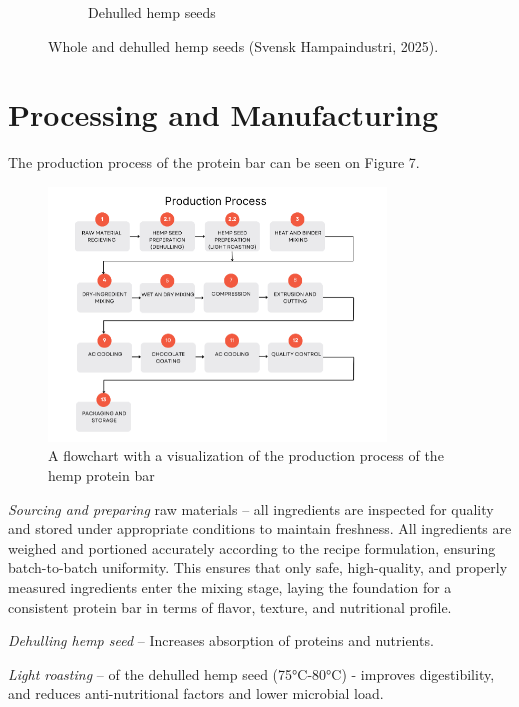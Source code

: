 \begin{figure}[h]
\begin{subfigure}{0.45\textwidth}
        \caption{Dehulled hemp seeds}
        \label{fig:dehulled_hemp}
    \end{subfigure}
    \caption{Whole and dehulled hemp seeds (Svensk Hampaindustri, 2025).}
    \label{fig:whole_dehulled}
\end{figure}


\section{Processing and Manufacturing}
The production process of the protein bar can be seen on Figure 7.
\begin{figure}[H]
    \centering
    \includegraphics[width=0.8\textwidth]{Figures/fig_process_01.png}
    \caption{A flowchart with a visualization of the production process of the hemp protein bar}
    \label{fig:process_flow_diagram}
\end{figure}

\textit{Sourcing and preparing} raw materials – all ingredients are inspected for quality and stored under appropriate conditions to maintain freshness. All ingredients are weighed and portioned accurately according to the recipe formulation, ensuring batch-to-batch uniformity. This ensures that only safe, high-quality, and properly measured ingredients enter the mixing stage, laying the foundation for a consistent protein bar in terms of flavor, texture, and nutritional profile.

\vspace{1em}
\textit{Dehulling hemp seed} – Increases absorption of proteins and nutrients.

\vspace{1em}
\textit{Light roasting} – of the dehulled hemp seed (75°C-80°C) - improves digestibility, and reduces anti-nutritional factors and lower microbial load.

